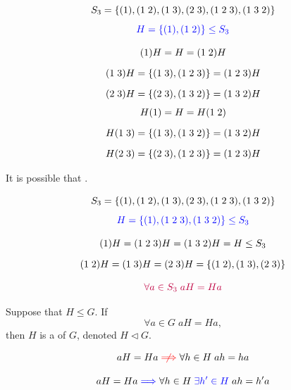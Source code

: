 
\begin{frame}
  \[
    S_{3} = \{(1), (1\; 2), (1\; 3), (2\; 3), (1\; 2\; 3), (1\; 3\; 2)\}
  \]
  \[
    \textcolor{blue}{H = \{(1), (1\; 2)\} \le S_{3}}
  \]

  \pause
  \vspace{-0.50cm}
  \begin{gather*}
    (1) H = H = (1\; 2) H \\[6pt]
    (1\; 3) H = \{(1\; 3), (1\; 2\; 3)\} = (1\; 2\; 3)H \\[6pt]
    (2\; 3) H = \{(2\; 3), (1\; 3\; 2)\} = (1\; 3\; 2)H
  \end{gather*}
  \pause
  \vspace{-0.80cm}
  \begin{gather*}
    H(1) = H = H (1\; 2) \\[6pt]
    H(1\; 3) = \{(1\; 3), (1\; 3\; 2)\} = (1\; 3\; 2)H \\[6pt]
    H(2\; 3) = \{(2\; 3), (1\; 2\; 3)\} = (1\; 2\; 3)H
  \end{gather*}

  \pause
  \vspace{0.10cm}
  \begin{center}
    It is possible that .
  \end{center}
\end{frame}

\begin{frame}
  \[
    S_{3} = \{(1), (1\; 2), (1\; 3), (2\; 3), (1\; 2\; 3), (1\; 3\; 2)\}
  \]
  \[
    \textcolor{blue}{H = \{(1), (1\; 2\; 3), (1\; 3\; 2)\} \le S_{3}}
  \]

  \pause
  \begin{gather*}
    (1)H = (1\;2\;3)H = (1\;3\;2)H = H \le S_{3} \\[6pt]
    (1\;2) H = (1\;3)H = (2\;3)H = \{(1\;2), (1\;3), (2\;3)\}
  \end{gather*}

  \pause
  \[
    \textcolor{purple}{\forall a \in S_{3}\; aH = Ha}
  \]
\end{frame}

\begin{frame}
  \begin{definition}
    Suppose that $H \le G$. If
    \[
      \forall a \in G\; aH = Ha,
    \]
    then $H$ is a  of $G$, denoted $H \triangleleft G$.
  \end{definition}

  \pause
  \[
    aH = Ha \red{\centernot\implies} \forall h \in H\; ah = ha
  \]

  \pause
  \[
    aH = Ha \textcolor{blue}{\implies} \forall h \in H\; \textcolor{blue}{\exists h' \in H\;} ah = h'a
  \]
\end{frame}

